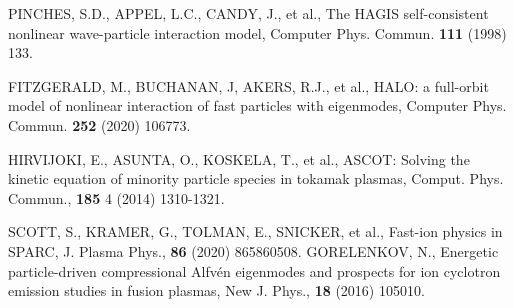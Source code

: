 \documentclass[10pt, a4paper, twoside]{article}
\begin{document}
\begin{thebibliography}{9}
    PINCHES, S.D., APPEL, L.C., CANDY, J., et al.,
    The HAGIS self-consistent nonlinear wave-particle interaction model,
    Computer Phys. Commun.
    \textbf{111}
    (1998)
    133.

    FITZGERALD, M., BUCHANAN, J, AKERS, R.J., et al.,
    HALO: a full-orbit model of nonlinear interaction of fast particles with eigenmodes,
    Computer Phys. Commun.
    \textbf{252}
    (2020)
    106773.

    HIRVIJOKI, E., ASUNTA, O., KOSKELA, T., et al.,
    ASCOT: Solving the kinetic equation of minority particle species in tokamak plasmas,
    Comput. Phys. Commun.,
    \textbf{185} 4 
    (2014) 
    1310-1321.

    SCOTT, S., KRAMER, G., TOLMAN, E., SNICKER, et al.,
    Fast-ion physics in SPARC,
    J. Plasma Phys.,
    \textbf{86}
    (2020) 
    865860508.
    GORELENKOV, N.,
    Energetic particle-driven compressional Alfv\'en eigenmodes and prospects for ion cyclotron emission studies in fusion plasmas,
    New J. Phys.,
    \textbf{18}
    (2016) 
    105010.



\end{thebibliography}
\end{document}
